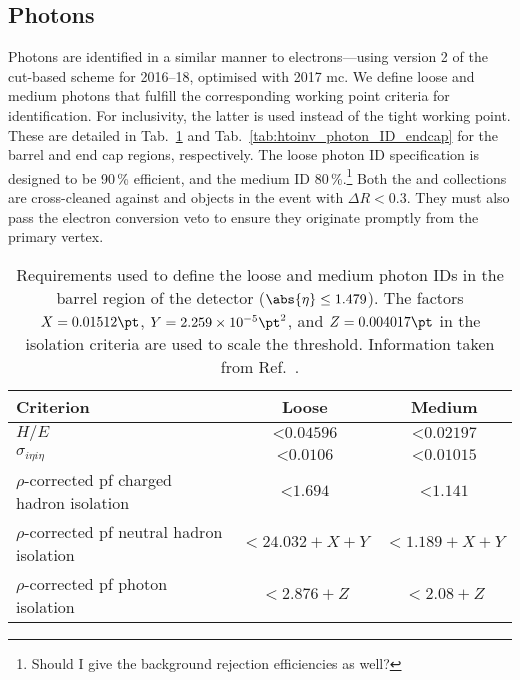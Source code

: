 

\subsection{Photons}
\label{subsec:objects_photons}

Photons are identified in a similar manner to electrons---using version 2 of the cut-based scheme for 2016--18, optimised with 2017 \acrlong{mc}. We define loose \loosePhoton and medium photons \mediumPhoton that fulfill the corresponding working point criteria for identification. For inclusivity, the latter is used instead of the tight working point. These are detailed in Tab.~\ref{tab:htoinv_photon_ID_barrel} and Tab.~\ref{tab:htoinv_photon_ID_endcap} for the barrel and end cap regions, respectively. The loose photon ID specification is designed to be 90\,\% efficient, and the medium ID 80\,\%.\footnote{Should I give the background rejection efficiencies as well?} Both the \loosePhoton and \mediumPhoton collections are cross-cleaned against \looseMuon and \vetoEle objects in the event with $\Delta R < \text{0.3}$. They must also pass the electron conversion veto to ensure they originate promptly from the primary vertex.

\begin{table}[htbp]
    \centering
    \begin{tabular}{lcc}
        \hline
        Criterion & Loose & Medium \\\hline
        $H/E$ & $< \text{0.04596}$ & $< \text{0.02197}$ \\
        $\sigma_{i\eta i\eta}$ & $< \text{0.0106}$ & $< \text{0.01015}$ \\
        $\rho$-corrected \acrshort{pf} charged hadron isolation & $< \text{1.694}$ & $< \text{1.141}$ \\
        $\rho$-corrected \acrshort{pf} neutral hadron isolation & $< \text{24.032} + X + Y$ & $< \text{1.189} + X + Y$ \\
        $\rho$-corrected \acrshort{pf} photon isolation & $< \text{2.876} + Z$ & $< \text{2.08} + Z$ \\\hline
    \end{tabular}
    \caption[Requirements used to define the loose and medium photon IDs in the barrel region of the detector ($\abs{\eta} \leq \text{1.479}$)]{Requirements used to define the loose and medium photon IDs in the barrel region of the detector ($\abs{\eta} \leq \text{1.479}$). The factors $X = \text{0.01512}\pt$, $Y = \text{2.259} \times \text{10}^{-5}\pt^2$, and $Z = \text{0.004017}\pt$ in the isolation criteria are used to scale the threshold. Information taken from Ref.~.}
    \label{tab:htoinv_photon_ID_barrel}
\end{table}

